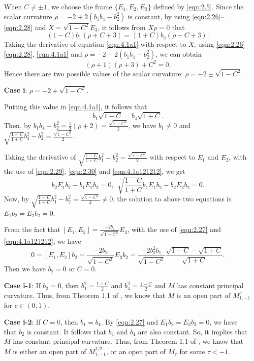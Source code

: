 \documentclass[reqno]{amsart}%
\theoremstyle{definition}
\numberwithin{equation}{section}
\begin{document}
When $C\neq\pm1$, we choose the frame $\{E_1,E_2,E_3\}$ defined by \eqref{eqn:2.5}. Since the scalar curvature
$\rho=-2+2(b_1b_4-b_2^2)$ is constant, by using \eqref{eqn:2.26}--\eqref{eqn:2.28} and $X=\sqrt{1-C^2}E_3$, it follows from $X\rho=0$ that
\begin{equation}\label{eqn:4.1a1}
(1-C)b_1(\rho+C+3)=(1+C)b_4(\rho-C+3).
\end{equation}
Taking the derivative of equation \eqref{eqn:4.1a1} with respect to $X$, using \eqref{eqn:2.26}--\eqref{eqn:2.28}, \eqref{eqn:4.1a1} and $\rho=-2+2(b_1b_4-b_2^2)$, we can obtain
$$
(\rho+1)(\rho+3)+C^2=0.
$$
Hence there are two possible values of the scalar curvature: $\rho=-2\pm\sqrt{1-C^2}$.

{\bf Case i}: $\rho=-2+\sqrt{1-C^2}$.

Putting this value in \eqref{eqn:4.1a1}, it follows that
\begin{equation}\label{eqn:4.1a121212}
b_1\sqrt{1-C}=b_4\sqrt{1+C}.
\end{equation}
Then, by $b_1b_4-b_2^2=\frac{1}{2}(\rho+2)=\frac{\sqrt{1-C^2}}{2}$, we have $b_1\neq0$ and
$\sqrt{\frac{1-C}{1+C}}b_1^2-b_2^2=\frac{\sqrt{1-C^2}}{2}$.

Taking the derivative of $\sqrt{\frac{1-C}{1+C}}b_1^2-b_2^2=\frac{\sqrt{1-C^2}}{2}$ with respect to $E_1$ and $E_2$, with the use of \eqref{eqn:2.29}, \eqref{eqn:2.30} and \eqref{eqn:4.1a121212}, we get
$$
b_2E_1b_2-b_1E_2b_2=0,\ \ \sqrt{\frac{1-C}{1+C}}b_1E_1b_2-b_2E_2b_2=0.
$$
Now, by $\sqrt{\frac{1-C}{1+C}}b_1^2-b_2^2=\frac{\sqrt{1-C^2}}{2}\neq0$, the solution to above two equations is $E_1b_2=E_2b_2=0$.

From the fact that $[E_1,E_2]=\frac{-2b_2}{\sqrt{1-C^2}}E_3$, with the use of \eqref{eqn:2.27} and
\eqref{eqn:4.1a121212}, we have
$$
0=[E_1,E_2]b_2=\frac{-2b_2}{\sqrt{1-C^2}}E_3b_2
=\frac{-2b_2^2b_1}{\sqrt{1-C^2}}\frac{\sqrt{1-C}-\sqrt{1+C}}{\sqrt{1+C}}.
$$
Then we have $b_2=0$ or $C=0$.

{\bf Case i-1}: If $b_2=0$, then $b_1^2=\frac{1+C}{2}$ and $b_4^2=\frac{1-C}{2}$ and
$M$ has constant principal curvature. Thus, from Theorem 1.1 of \cite{GMY}, we know that $M$ is an open part of $M_{1,-1}^c$ for $c\in(0,1)$.

{\bf Case i-2}: If $C=0$, then $b_1=b_4$. By \eqref{eqn:2.27} and $E_1b_2=E_2b_2=0$, we have that
$b_2$ is constant. It follows that $b_1$ and $b_4$ are also constant.
So, it implies that $M$ has constant principal curvature.
Thus, from Theorem 1.1 of \cite{GMY}, we know that $M$ is either an open part of $M_{1,-1}^{1/2}$,
or an open part of $M_\tau$ for some $\tau<-1$.
\end{document}
